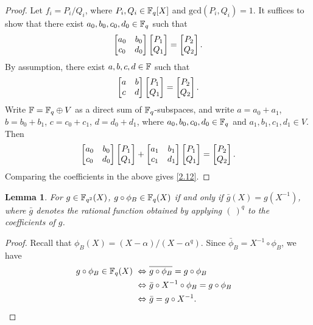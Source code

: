 \documentclass{amsart}
\newtheorem{lem}[thm]{Lemma}
\numberwithin{equation}{section}
\theoremstyle{definition}
\newcommand{\f}{\Bbb F}
\begin{document}
\begin{proof}
Let $f_i=P_i/Q_i$, where $P_i,Q_i\in\f_q[X]$ and $\text{gcd}(P_i,Q_i)=1$. It suffices to show that there exist $a_0,b_0,c_0,d_0\in\f_q$ such that 
\begin{equation}\label{2.12}
\left[\begin{matrix}a_0&b_0\cr c_0&d_0\end{matrix}\right]\left[\begin{matrix}P_1\cr Q_1\end{matrix}\right]=\left[\begin{matrix}P_2\cr Q_2\end{matrix}\right].\end{equation}
By assumption, there exist $a,b,c,d\in\f$ such that 
\[
\left[\begin{matrix}a&b\cr c&d\end{matrix}\right]\left[\begin{matrix}P_1\cr Q_1\end{matrix}\right]=\left[\begin{matrix}P_2\cr Q_2\end{matrix}\right].
\]
Write $\f=\f_q\oplus V$ as a direct sum of $\f_q$-subspaces, and write $a=a_0+a_1$, $b=b_0+b_1$, $c=c_0+c_1$, $d=d_0+d_1$, where $a_0,b_0,c_0,d_0\in\f_q$ and $a_1,b_1,c_1,d_1\in V$. Then
\[
\left[\begin{matrix}a_0&b_0\cr c_0&d_0\end{matrix}\right]\left[\begin{matrix}P_1\cr Q_1\end{matrix}\right]+\left[\begin{matrix}a_1&b_1\cr c_1&d_1\end{matrix}\right]\left[\begin{matrix}P_1\cr Q_1\end{matrix}\right]=\left[\begin{matrix}P_2\cr Q_2\end{matrix}\right].
\]
Comparing the coefficients in the above gives \eqref{2.12}.
\end{proof}

\begin{lem}\label{L2.4}
For $g\in\f_{q^2}(X)$, $g\circ\phi_B\in\f_q(X)$ if and only if $\bar g(X)=g(X^{-1})$, where $\bar g$ denotes the rational function obtained by applying $(\ )^q$ to the coefficients of $g$.
\end{lem}

\begin{proof}
Recall that $\phi_B(X)=(X-\alpha)/(X-\alpha^q)$. Since $\bar\phi_B=X^{-1}\circ\phi_B$, we have
\begin{align*}
g\circ\phi_B\in\f_q(X)\ \Leftrightarrow\ &\overline{g\circ\phi_B}=g\circ\phi_B\cr
\Leftrightarrow\ &\bar g\circ X^{-1}\circ\phi_B=g\circ\phi_B\cr
\Leftrightarrow\ &\bar g=g\circ X^{-1}.
\end{align*}
\end{proof}
\end{document}
